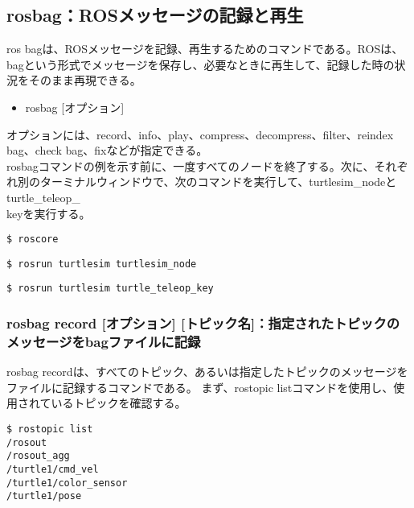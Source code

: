 \subsection{rosbag：ROSメッセージの記録と再生}

ros bagは、ROSメッセージを記録、再生するためのコマンドである。ROSは、bagという形式でメッセージを保存し、必要なときに再生して、記録した時の状況をそのまま再現できる。

\vspace{\baselineskip}
\begin{itemize}
\item rosbag [オプション]
\end{itemize}
\vspace{\baselineskip}

オプションには、record、info、play、compress、decompress、filter、reindex bag、check bag、fixなどが指定できる。\\

rosbagコマンドの例を示す前に、一度すべてのノードを終了する。次に、それぞれ別のターミナルウィンドウで、次のコマンドを実行して、turtlesim\_nodeとturtle\_teleop\_\\keyを実行する。

\begin{lstlisting}[language=ROS]
$ roscore
\end{lstlisting}

\begin{lstlisting}[language=ROS]
$ rosrun turtlesim turtlesim_node
\end{lstlisting}

\begin{lstlisting}[language=ROS]
$ rosrun turtlesim turtle_teleop_key
\end{lstlisting}


\subsubsection{rosbag record [オプション] [トピック名]：指定されたトピックのメッセージをbagファイルに記録}

rosbag recordは、すべてのトピック、あるいは指定したトピックのメッセージをファイルに記録するコマンドである。
まず、rostopic listコマンドを使用し、使用されているトピックを確認する。

\begin{lstlisting}[language=ROS]
$ rostopic list
/rosout
/rosout_agg
/turtle1/cmd_vel
/turtle1/color_sensor
/turtle1/pose
\end{lstlisting}


